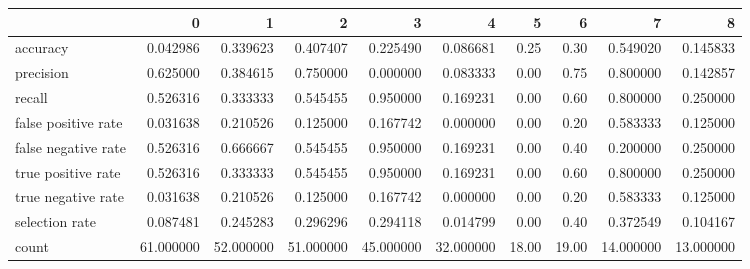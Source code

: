\begin{tabular}{lrrrrrrrrr}
\toprule
{} &          0 &          1 &          2 &          3 &          4 &      5 &      6 &          7 &          8 \\
\midrule
accuracy            &   0.042986 &   0.339623 &   0.407407 &   0.225490 &   0.086681 &   0.25 &   0.30 &   0.549020 &   0.145833 \\
precision           &   0.625000 &   0.384615 &   0.750000 &   0.000000 &   0.083333 &   0.00 &   0.75 &   0.800000 &   0.142857 \\
recall              &   0.526316 &   0.333333 &   0.545455 &   0.950000 &   0.169231 &   0.00 &   0.60 &   0.800000 &   0.250000 \\
false positive rate &   0.031638 &   0.210526 &   0.125000 &   0.167742 &   0.000000 &   0.00 &   0.20 &   0.583333 &   0.125000 \\
false negative rate &   0.526316 &   0.666667 &   0.545455 &   0.950000 &   0.169231 &   0.00 &   0.40 &   0.200000 &   0.250000 \\
true positive rate  &   0.526316 &   0.333333 &   0.545455 &   0.950000 &   0.169231 &   0.00 &   0.60 &   0.800000 &   0.250000 \\
true negative rate  &   0.031638 &   0.210526 &   0.125000 &   0.167742 &   0.000000 &   0.00 &   0.20 &   0.583333 &   0.125000 \\
selection rate      &   0.087481 &   0.245283 &   0.296296 &   0.294118 &   0.014799 &   0.00 &   0.40 &   0.372549 &   0.104167 \\
count               &  61.000000 &  52.000000 &  51.000000 &  45.000000 &  32.000000 &  18.00 &  19.00 &  14.000000 &  13.000000 \\
\bottomrule
\end{tabular}

